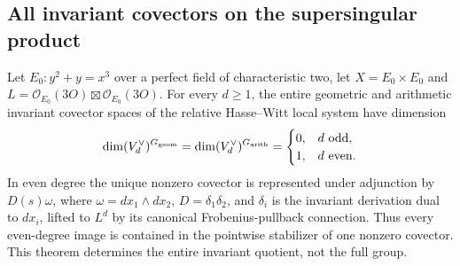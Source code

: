 \subsection{All invariant covectors on the supersingular product}
\label{subsec:ss-exact-covectors}

\begin{theorem}\label{thm:ss-product-exact-covectors}
Let $E_0:y^2+y=x^3$ over a perfect field of characteristic two, let
$X=E_0\times E_0$ and
$L=\mathcal O_{E_0}(3O)\boxtimes\mathcal O_{E_0}(3O)$.
For every $d\ge1$, the entire geometric and arithmetic invariant
covector spaces of the relative Hasse--Witt local system have dimension
\[
 \dim(V_d^\vee)^{G_{\rm geom}}
 =\dim(V_d^\vee)^{G_{\rm arith}}
 =\begin{cases}0,&d\text{ odd},\\1,&d\text{ even}.
 \end{cases}
\]
In even degree the unique nonzero covector is represented under
adjunction by $D(s)\omega$, where
$\omega=dx_1\wedge dx_2$, $D=\delta_1\delta_2$, and $\delta_i$
is the invariant derivation dual to $dx_i$, lifted to $L^d$ by its
canonical Frobenius-pullback connection. Thus every even-degree image
is contained in the pointwise stabilizer of one nonzero covector.
This theorem determines the entire invariant quotient, not the full group.
\end{theorem}

